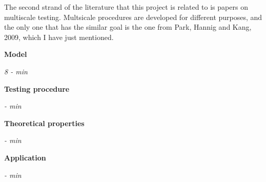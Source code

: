 \documentclass[a4paper,12pt]{article}
\begin{document}
The second strand of the literature that this project is related to is papers on multiscale testing. Multsicale procedures are developed for different purposes, and the only one that has the similar goal is the one from Park, Hannig and Kang, 2009, which I have just mentioned.

\textbf{Model}

\emph{8 -  min}

\textbf{Testing procedure}

\emph{ -  min}

\textbf{Theoretical properties}

\emph{ -  min}

\textbf{Application}

 \emph{ -  min}
\end{document}
